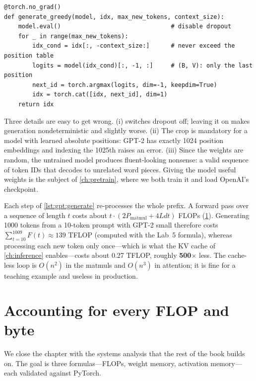 \begin{lstlisting}[caption={Greedy generation without a cache.},label={lst:gpt:generate}]
@torch.no_grad()
def generate_greedy(model, idx, max_new_tokens, context_size):
    model.eval()                               # disable dropout
    for _ in range(max_new_tokens):
        idx_cond = idx[:, -context_size:]      # never exceed the position table
        logits = model(idx_cond)[:, -1, :]     # (B, V): only the last position
        next_id = torch.argmax(logits, dim=-1, keepdim=True)
        idx = torch.cat([idx, next_id], dim=1)
    return idx
\end{lstlisting}

Three details are easy to get wrong. (i)  switches dropout off; leaving it on
makes generation nondeterministic and slightly worse. (ii) The crop
 is mandatory for a model with learned absolute positions: GPT-2 has
exactly 1024 position embeddings and indexing the 1025th raises an error. (iii) Since the weights
are random, the untrained model produces fluent-looking nonsense: a valid sequence of token IDs that
decodes to unrelated word pieces. Giving the model useful weights is the subject of
\cref{ch:pretrain}, where we both train it and load OpenAI's checkpoint.

\begin{napkinmath}
Each step of \cref{lst:gpt:generate} re-processes the whole prefix. A forward pass over a sequence of
length $t$ costs about $t\cdot(2P_\text{matmul} + 4Ldt)$ FLOPs (\cref{sec:gpt:accounting}). Generating
1000 tokens from a 10-token prompt with GPT-2 small therefore costs
$\sum_{t=10}^{1009} F(t)\approx139$ TFLOP (computed with the Lab~5 formula), whereas
processing each new token only once---which is what the KV cache of \cref{ch:inference} enables---costs
about 0.27 TFLOP, roughly \textbf{500$\times$} less. The cache-less loop is
$O(n^2)$ in the matmuls and $O(n^3)$ in attention; it is fine for a teaching example and useless in
production.
\end{napkinmath}

\section{Accounting for every FLOP and byte}\label{sec:gpt:accounting}

We close the chapter with the systems analysis that the rest of the book builds on. The goal is
three formulas---FLOPs, weight memory, activation memory---each validated against PyTorch.

